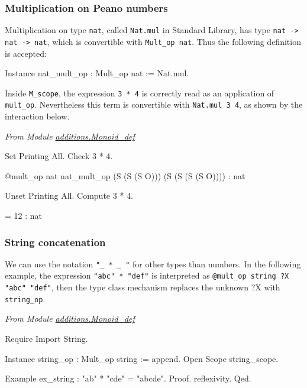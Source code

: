 \subsubsection{Multiplication on Peano numbers}

Multiplication  on type \texttt{nat}, called \texttt{Nat.mul} in
Standard Library, has  type \linebreak \texttt{nat -> nat -> nat}, which is
convertible  with \texttt{Mult\_op nat}. Thus the following definition is
accepted:

\begin{Coqsrc}
Instance nat_mult_op : Mult_op nat  := Nat.mul.
\end{Coqsrc}

Inside \texttt{M\_scope}, the expression \texttt{3 * 4} is 
correctly read as an application of \texttt{mult\_op}. Nevertheless 
this term is convertible with \texttt{Nat.mul 3 4}, as shown by the 
interaction below.

\emph{From Module \href{../theories/html/additions.Monoid_def.html}{additions.Monoid\_def}}

\begin{Coqsrc}
Set Printing All.
Check  3 * 4. 
\end{Coqsrc}
\begin{Coqanswer}
@mult_op nat nat_mult_op (S (S (S O))) (S (S (S (S O))))
     : nat  
\end{Coqanswer}
\begin{Coqsrc}
Unset Printing All.
Compute 3 * 4.   
\end{Coqsrc}
\begin{Coqanswer}
 = 12  : nat  
\end{Coqanswer}

\subsubsection{String concatenation}
We can use the notation \texttt{"\_ * \_ "} for other types than numbers.
In the following example,  the expression \texttt{"abc" * "def"} is interpreted
as \linebreak \texttt{@mult\_op string  {\color{darkred}?X} "abc"  "def"}, then the type  class mechanism replaces the unknown  {\color{darkred}?X} with 
\texttt{string\_op}.


\emph{From Module \href{../theories/html/additions.Monoid_def.html}{additions.Monoid\_def}}

\begin{Coqsrc}
Require Import String.

Instance string_op : Mult_op string := append.
Open Scope string_scope.

Example ex_string : "ab" * "cde" = "abcde".
Proof. reflexivity. Qed.
\end{Coqsrc}


